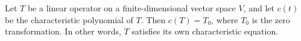 \documentclass[12pt]{article}
\begin{document}
Let $T$ be a linear operator on a finite-dimensional vector space $V$, and let $c(t)$ be the characteristic polynomial of $T$.  Then $c(T)=T_0$, where $T_0$ is the zero transformation. In other words, $T$ satisfies its own characteristic equation.
\end{document}
